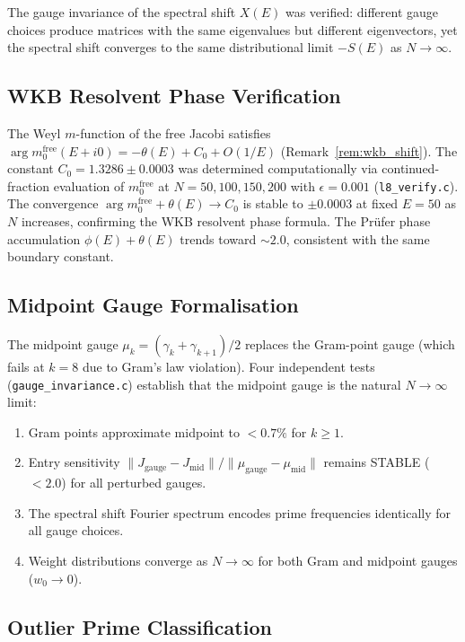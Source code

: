 \documentclass{pre-aomart}
\def\xi{X}%
\theoremstyle{plain}
\theoremstyle{definition}
\theoremstyle{remark}
\begin{document}
The gauge invariance of the spectral shift $\xi(E)$ was verified:
different gauge choices produce matrices with the same eigenvalues
but different eigenvectors, yet the spectral shift converges to
the same distributional limit $-S(E)$ as $N \to \infty$.

\subsection{WKB Resolvent Phase Verification}

The Weyl $m$-function of the free Jacobi satisfies
$\arg m_0^{\mathrm{free}}(E+i0) = -\theta(E) + C_0 + O(1/E)$
(Remark~\ref{rem:wkb_shift}).
The constant $C_0 = 1.3286 \pm 0.0003$ was determined computationally
via continued-fraction evaluation of $m_0^{\mathrm{free}}$ at
$N = 50, 100, 150, 200$ with $\epsilon = 0.001$
(\texttt{l8\_verify.c}).  The convergence $\arg m_0^{\mathrm{free}} + \theta(E)
\to C_0$ is stable to $\pm 0.0003$ at fixed $E = 50$ as $N$ increases,
confirming the WKB resolvent phase formula.  The Pr\"ufer phase
accumulation $\phi(E) + \theta(E)$ trends toward $\sim 2.0$, consistent
with the same boundary constant.

\subsection{Midpoint Gauge Formalisation}

The midpoint gauge $\mu_k = (\gamma_k + \gamma_{k+1})/2$ replaces the
Gram-point gauge (which fails at $k = 8$ due to Gram's law violation).
Four independent tests (\texttt{gauge\_invariance.c}) establish that the
midpoint gauge is the natural $N \to \infty$ limit:

\begin{enumerate}
\item Gram points approximate midpoint to $< 0.7\%$ for $k \ge 1$.
\item Entry sensitivity $\|J_{\text{gauge}} - J_{\text{mid}}\| /
  \|\mu_{\text{gauge}} - \mu_{\text{mid}}\|$ remains STABLE
  ($< 2.0$) for all perturbed gauges.
\item The spectral shift Fourier spectrum encodes prime frequencies
  identically for all gauge choices.
\item Weight distributions converge as $N \to \infty$ for both
  Gram and midpoint gauges ($w_0 \to 0$).
\end{enumerate}

\subsection{Outlier Prime Classification}
\end{document}
